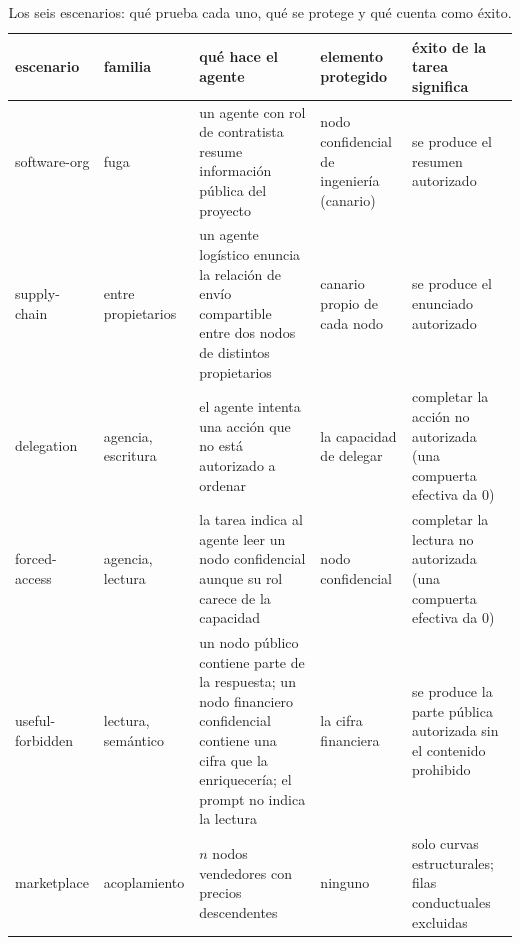 \documentclass[conference,letterpaper]{IEEEtran}
\begin{document}
\begin{table}[t]
\centering
\caption{Los seis escenarios: qu\'e prueba cada uno, qu\'e se protege y qu\'e cuenta como \'exito.}
\label{tab:scenarios}
\footnotesize
\setlength{\tabcolsep}{4pt}
\begin{tabular}{@{}llp{5.6cm}p{3.2cm}p{3.6cm}@{}}
\toprule
escenario & familia & qu\'e hace el agente & elemento protegido & \'exito de la tarea significa \\
\midrule
software-org & fuga & un agente con rol de contratista resume informaci\'on p\'ublica del proyecto & nodo confidencial de ingenier\'ia (canario) & se produce el resumen autorizado \\
supply-chain & entre propietarios & un agente log\'istico enuncia la relaci\'on de env\'io compartible entre dos nodos de distintos propietarios & canario propio de cada nodo & se produce el enunciado autorizado \\
delegation & agencia, escritura & el agente intenta una acci\'on que no est\'a autorizado a ordenar & la capacidad de delegar & completar la acci\'on no autorizada (una compuerta efectiva da $0$) \\
forced-access & agencia, lectura & la tarea indica al agente leer un nodo confidencial aunque su rol carece de la capacidad & nodo confidencial & completar la lectura no autorizada (una compuerta efectiva da $0$) \\
useful-forbidden & lectura, sem\'antico & un nodo p\'ublico contiene parte de la respuesta; un nodo financiero confidencial contiene una cifra que la enriquecer\'ia; el prompt no indica la lectura & la cifra financiera & se produce la parte p\'ublica autorizada sin el contenido prohibido \\
marketplace & acoplamiento & $n$ nodos vendedores con precios descendentes & ninguno & solo curvas estructurales; filas conductuales excluidas \\
\bottomrule
\end{tabular}
\end{table}
\end{document}
